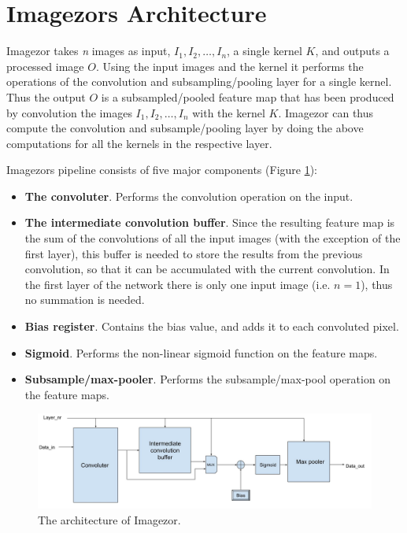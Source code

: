 \section{Imagezors Architecture}

Imagezor takes \textit{n} images as input, $ I_1, I_2, \dots, I_n $, a single kernel $ K $, and outputs a processed image $ O $. Using the input images and the kernel it performs the operations of the convolution and subsampling/pooling layer for a single kernel. Thus the output $ O $ is a subsampled/pooled feature map that has been produced by convolution the images $ I_1, I_2, \dots, I_n $ with the kernel $ K $. 
Imagezor can thus compute the convolution and subsample/pooling layer by doing the above computations for all the kernels in the respective layer. 

Imagezors pipeline consists of five major components (Figure \ref{fig_imagezor_architecture}):

\begin{itemize}
	\item \textbf{The convoluter}. Performs the convolution operation on the input.
	\item \textbf{The intermediate convolution buffer}. Since the resulting feature map is the sum of the convolutions of all the input images (with the exception of the first layer), this buffer is needed to store the results from the previous convolution, so that it can be accumulated with the current convolution. In the first layer of the network there is only one input image (i.e. $ n = 1 $), thus no summation is needed.
	\item \textbf{Bias register}. Contains the bias value, and adds it to each convoluted pixel. 
	\item \textbf{Sigmoid}. Performs the non-linear sigmoid function  on the feature maps.
	\item \textbf{Subsample/max-pooler}. Performs the subsample/max-pool operation on the feature maps. 
\end{itemize}

\begin{figure}[h!]
	\centering
    	\includegraphics[width=1.0\textwidth]{Figures/Method/conv_layer_arch}
  	\caption{The architecture of Imagezor.}
  	\label{fig_imagezor_architecture}
\end{figure}

